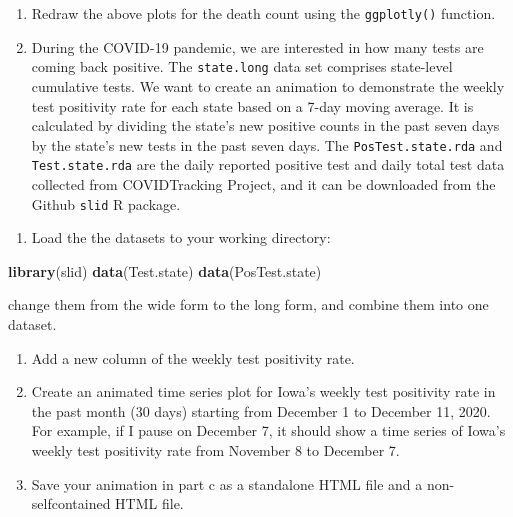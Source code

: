 \documentclass[]{book}
\newenvironment{Shaded}{\begin{snugshade}}{\end{snugshade}}
\newcommand{\KeywordTok}[1]{\textcolor[rgb]{0.13,0.29,0.53}{\textbf{#1}}}
\newcommand{\NormalTok}[1]{#1}
\providecommand{\tightlist}{%
  \setlength{\itemsep}{0pt}\setlength{\parskip}{0pt}}
\begin{document}
\begin{enumerate}
\def\labelenumi{\arabic{enumi}.}
\setcounter{enumi}{1}
\item
  Redraw the above plots for the death count using the
  \texttt{ggplotly()} function.
\item
  During the COVID-19 pandemic, we are interested in how many tests are
  coming back positive. The \texttt{state.long} data set comprises
  state-level cumulative tests. We want to create an animation to
  demonstrate the weekly test positivity rate for each state based on a
  7-day moving average. It is calculated by dividing the state's new
  positive counts in the past seven days by the state's new tests in the
  past seven days. The \texttt{PosTest.state.rda} and
  \texttt{Test.state.rda} are the daily reported positive test and daily
  total test data collected from COVIDTracking Project, and it can be
  downloaded from the Github \texttt{slid} R package.
\end{enumerate}

\begin{enumerate}
\def\labelenumi{\alph{enumi}.}
\tightlist
\item
  Load the the datasets to your working directory:
\end{enumerate}

\begin{Shaded}
\begin{Highlighting}[]
\KeywordTok{library}\NormalTok{(slid)}
\KeywordTok{data}\NormalTok{(Test.state)}
\KeywordTok{data}\NormalTok{(PosTest.state)}
\end{Highlighting}
\end{Shaded}

change them from the wide form to the long form, and combine them into
one dataset.

\begin{enumerate}
\def\labelenumi{\alph{enumi}.}
\setcounter{enumi}{1}
\item
  Add a new column of the weekly test positivity rate.
\item
  Create an animated time series plot for Iowa's weekly test positivity
  rate in the past month (30 days) starting from December 1 to December
  11, 2020. For example, if I pause on December 7, it should show a time
  series of Iowa's weekly test positivity rate from November 8 to
  December 7.
\item
  Save your animation in part c as a standalone HTML file and a
  non-selfcontained HTML file.
\end{enumerate}
\end{document}
